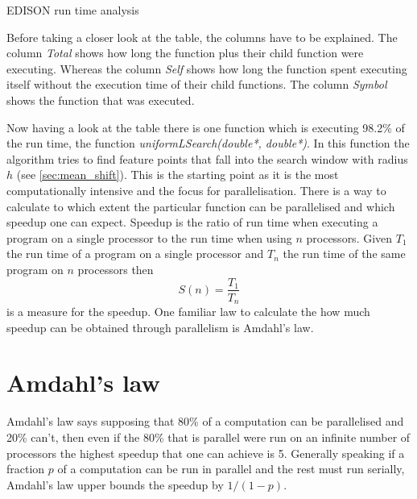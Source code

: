\begin{table}[ht]
  \centering
  \caption[\protect\Gls{EDISON} run time profile]{ \protect\Gls{EDISON} run time analysis}
  \label{tab:comped}
\end{table}

Before taking a closer look at the table, the columns have to be
explained. The column \emph{Total} shows how long the function plus
their child function were executing. Whereas the column \emph{Self}
shows how long the function spent executing itself without the
execution time of their child functions. The column \emph{Symbol}
shows the function that was executed.

Now having a look at the table there is one function which is
executing 98.2\% of the run time, the function
\emph{uniformLSearch(double*, double*)}. In this function the
algorithm tries to find feature points that fall into the search
window with radius $h$ (see \autoref{sec:mean_shift}). This is the
starting point as it is the most computationally intensive and the
focus for parallelisation. There is a way to calculate to which extent
the particular function can be parallelised and which speedup one can
expect. Speedup is the ratio of run time when executing a program on a
single processor to the run time when using $n$ processors. Given $T_1$
the run time of a program on a single processor and $T_n$ the run
time of the same program on $n$ processors then
\begin{equation}\label{eq:speedup}
  S(n) = \frac{T_1}{T_n}
\end{equation}
is a measure for the speedup. One familiar law to calculate the how
much speedup can be obtained through parallelism is Amdahl's law.

\section{Amdahl's law}
\label{sec:amdahl_s_law}
Amdahl's law says supposing that 80\% of a computation can be
parallelised and 20\% can't, then even if the 80\% that is parallel
were run on an infinite number of processors the highest speedup that
one can achieve is 5. Generally speaking if a fraction $p$ of a
computation can be run in parallel and the rest must run serially,
Amdahl's law upper bounds the speedup by $1/(1-p)$.

